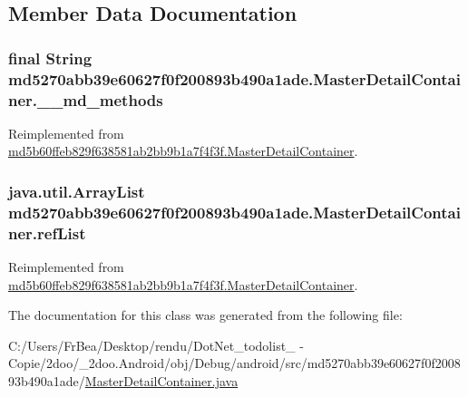 \subsection{Member Data Documentation}
\hypertarget{classmd5270abb39e60627f0f200893b490a1ade_1_1_master_detail_container_c82bf846b500c62b8736305937c47350}{
\subsubsection[{\_\-\_\-md\_\-methods}]{\setlength{\rightskip}{0pt plus 5cm}final String {\bf md5270abb39e60627f0f200893b490a1ade.MasterDetailContainer.\_\-\_\-md\_\-methods}}}
\label{classmd5270abb39e60627f0f200893b490a1ade_1_1_master_detail_container_c82bf846b500c62b8736305937c47350}




Reimplemented from \hyperlink{classmd5b60ffeb829f638581ab2bb9b1a7f4f3f_1_1_master_detail_container_556c7fb30e166beeb9cd843dea89366f}{md5b60ffeb829f638581ab2bb9b1a7f4f3f.MasterDetailContainer}.\hypertarget{classmd5270abb39e60627f0f200893b490a1ade_1_1_master_detail_container_c49f1f25904383f281279d9ee9f9fba0}{
\subsubsection[{refList}]{\setlength{\rightskip}{0pt plus 5cm}java.util.ArrayList {\bf md5270abb39e60627f0f200893b490a1ade.MasterDetailContainer.refList}}}
\label{classmd5270abb39e60627f0f200893b490a1ade_1_1_master_detail_container_c49f1f25904383f281279d9ee9f9fba0}




Reimplemented from \hyperlink{classmd5b60ffeb829f638581ab2bb9b1a7f4f3f_1_1_master_detail_container_b2c4d24cca5bde061bd6ca0b037af523}{md5b60ffeb829f638581ab2bb9b1a7f4f3f.MasterDetailContainer}.

The documentation for this class was generated from the following file:\begin{CompactItemize}
\item 
C:/Users/FrBea/Desktop/rendu/DotNet\_\-todolist\_ - Copie/2doo/\_\-2doo.Android/obj/Debug/android/src/md5270abb39e60627f0f200893b490a1ade/\hyperlink{md5270abb39e60627f0f200893b490a1ade_2_master_detail_container_8java}{MasterDetailContainer.java}\end{CompactItemize}
